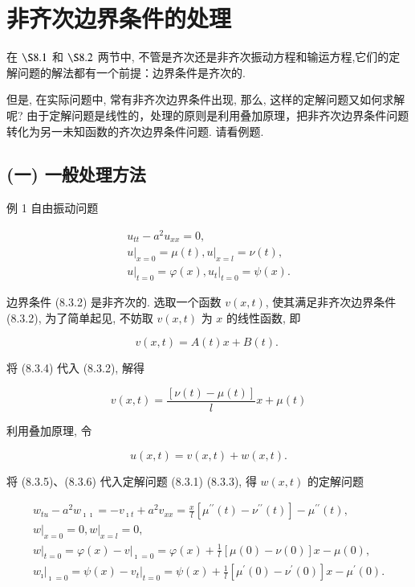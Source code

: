 \section{非齐次边界条件的处理}
\label{eq:inhomo_boundary}

在 $\S 8.1$ 和 $\S 8.2$ 两节中, 不管是齐次还是非齐次振动方程和输运方程,它们的定解问题的解法都有一个前提：边界条件是齐次的.

但是, 在实际问题中, 常有非齐次边界条件出现, 那么, 这样的定解问题又如何求解呢? 由于定解问题是线性的，处理的原则是利用叠加原理，把非齐次边界条件问题转化为另一未知函数的齐次边界条件问题. 请看例题.

\subsection{(一) 一般处理方法}
例 1 自由振动问题

$$
\begin{gathered}
u_{t t}-a^{2} u_{x x}=0, \\
\left.u\right|_{x=0}=\mu(t),\left.u\right|_{x=l}=\nu(t), \\
\left.u\right|_{t=0}=\varphi(x),\left.u_{t}\right|_{t=0}=\psi(x) .
\end{gathered}
$$

边界条件 (8.3.2) 是非齐次的.
选取一个函数 $v(x, t)$, 使其满足非齐次边界条件 (8.3.2), 为了简单起见, 不妨取 $v(x, t)$ 为 $x$ 的线性函数, 即

$$
v(x, t)=A(t) x+B(t) \text {. }
$$

将 (8.3.4) 代入 (8.3.2), 解得

$$
v(x, t)=\frac{[\nu(t)-\mu(t)]}{l} x+\mu(t)
$$

利用叠加原理, 令

$$
u(x, t)=v(x, t)+w(x, t) .
$$

将 (8.3.5)、(8.3.6) 代入定解问题 (8.3.1) (8.3.3), 得 $w(x, t)$ 的定解问题

$$
\begin{gathered}
w_{t u}-a^{2} w_{\imath \imath}=-v_{\imath t}+a^{2} v_{x x}=\frac{x}{l}\left[\mu^{\prime \prime}(t)-\nu^{\prime \prime}(t)\right]-\mu^{\prime \prime}(t), \\
\left.w\right|_{x=0}=0,\left.w\right|_{x=l}=0, \\
\left.w\right|_{t=0}=\varphi(x)-\left.v\right|_{\imath=0}=\varphi(x)+\frac{1}{l}[\mu(0)-\nu(0)] x-\mu(0), \\
\left.w_{\imath}\right|_{\imath=0}=\psi(x)-\left.v_{t}\right|_{t=0}=\psi(x)+\frac{1}{l}\left[\mu^{\prime}(0)-\nu^{\prime}(0)\right] x-\mu^{\prime}(0) .
\end{gathered}
$$

